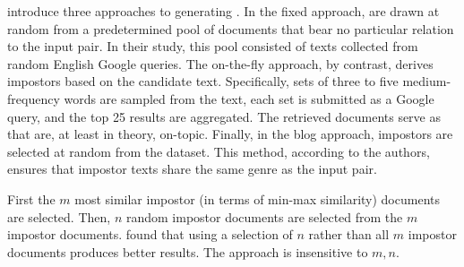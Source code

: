 \citet{koppel_determining_2014} introduce three approaches to generating \imps{}. 
In the fixed approach, \imps{} are drawn at random from a predetermined pool of documents that bear no particular relation to the input pair.
In their study, this pool consisted of texts collected from random English Google queries. 
The on-the-fly approach, by contrast, derives impostors based on the candidate text. 
Specifically, sets of three to five medium-frequency words are sampled from the text, each set is submitted as a Google query, and the top 25 results are aggregated. 
The retrieved documents serve as \imps{} that are, at least in theory, on-topic. 
Finally, in the blog approach, impostors are selected at random from the \dataBlog{} dataset. 
This method, according to the authors, ensures that impostor texts share the same genre as the input pair.


First the $m$ most similar impostor (in terms of min-max similarity) documents are selected.
Then, $n$ random impostor documents are selected from the $m$ impostor documents.
\citet{koppel_determining_2014} found that using a selection of $n$ \imps{} rather than all $m$ impostor documents produces better results.
The approach is insensitive to $m,n$.